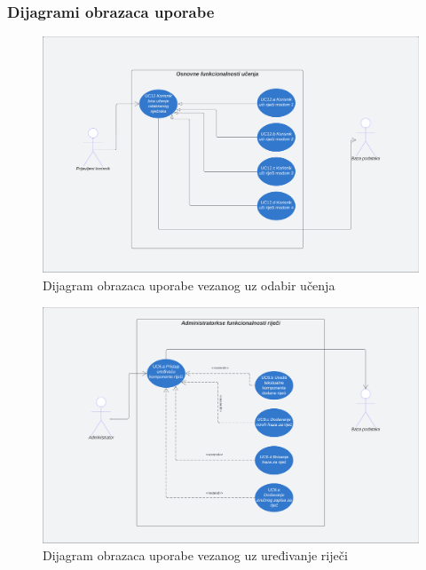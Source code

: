 				\subsubsection{Dijagrami obrazaca uporabe}
				\begin{figure}[H]
					\includegraphics[scale=0.5]{dijagrami/OsnovnaFunkcionalnost.png} 
					\centering
					\caption{Dijagram obrazaca uporabe vezanog uz odabir učenja} 
					\label{fig:class_diagram}
				\end{figure}
				\eject	
				\begin{figure}[H]
					\includegraphics[scale=0.5]{dijagrami/OsnovnaFunkcionalnostAdmina.png} 
					\centering
					\caption{Dijagram obrazaca uporabe vezanog uz uređivanje riječi} 
					\label{fig:class_diagram}
				\end{figure}
				\eject	
